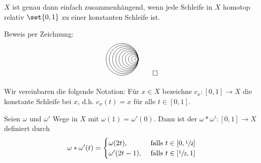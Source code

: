 \begin{lemma}[{name=[Charakterisierung von einfach zusammenhängend mittels Homotopie]},label=lem:einf-zsmh-homotopie]
	$X$ ist genau dann einfach zusammenhängend, wenn jede Schleife in $X$ homotop relativ $\set{0,1}$ zu einer konstanten Schleife ist.
\end{lemma}
\begin{beweis}
	Beweis per Zeichnung:
	\[
		\begin{tikzpicture}[scale=0.8]
			\foreach \r in {0.1, 0.2,...,1}{
				\draw (0,0) arc (0:360:\r); 
			}
		\end{tikzpicture}\qedhere
	\]
\end{beweis}

Wir vereinbaren die folgende Notation: 
Für $x \in X$ bezeichne $c_x \colon [0,1] \to X$ die konstante Schleife bei $x$, d.h. $c_x(t)= x $ für alle $ t \in [0,1]$.

\begin{definition}[{name=[Kompositionsweg]},label=def:kompositionsweg]
	Seien $\omega$ und $\omega'$ Wege in $X$ mit $\omega(1)= \omega'(0)$. 
	Dann ist der  $\omega * \omega' \colon [0,1] \to X$ definiert durch 
	\[
		\omega * \omega' (t) = \begin{cases}
			\omega(2 t), &\text{ falls }t \in [0, \sfrac{1}{2}]\\
			\omega'(2t -1), &\text{ falls } t \in [\sfrac{1}{2},1]
		\end{cases}
	\]
\end{definition}

